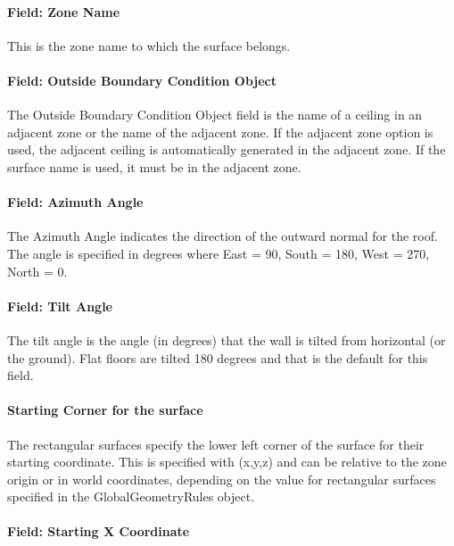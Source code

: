 \paragraph{Field: Zone Name}\label{field-zone-name-9-001}

This is the zone name to which the surface belongs.

\paragraph{Field: Outside Boundary Condition Object}\label{field-outside-boundary-condition-object-2}

The Outside Boundary Condition Object field is the name of a ceiling in an adjacent zone or the name of the adjacent zone. If the adjacent zone option is used, the adjacent ceiling is automatically generated in the adjacent zone. If the surface name is used, it must be in the adjacent zone.

\paragraph{Field: Azimuth Angle}\label{field-azimuth-angle-9}

The Azimuth Angle indicates the direction of the outward normal for the roof. The angle is specified in degrees where East = 90, South = 180, West = 270, North = 0.

\paragraph{Field: Tilt Angle}\label{field-tilt-angle-9}

The tilt angle is the angle (in degrees) that the wall is tilted from horizontal (or the ground). Flat floors are tilted 180 degrees and that is the default for this field.

\paragraph{Starting Corner for the surface}\label{starting-corner-for-the-surface-9}

The rectangular surfaces specify the lower left corner of the surface for their starting coordinate. This is specified with (x,y,z) and can be relative to the zone origin or in world coordinates, depending on the value for rectangular surfaces specified in the GlobalGeometryRules object.

\paragraph{Field: Starting X Coordinate}\label{field-starting-x-coordinate-9}


